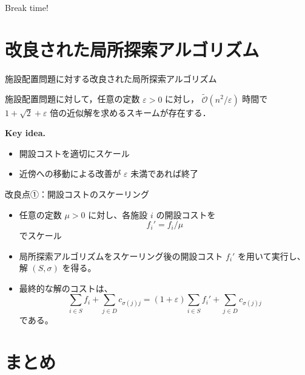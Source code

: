 \documentclass[aspectratio=169]{beamer}
\begin{document}
\begin{frame}[standout]
  Break time!
\end{frame}

\section{改良された局所探索アルゴリズム}

\begin{frame}{施設配置問題に対する改良された局所探索アルゴリズム}
  \begin{theorem}
    施設配置問題に対して，任意の定数 \(\varepsilon > 0\) に対し，
    \alert{\(\tilde{\mathcal{O}}(n^2/\varepsilon)\)} 時間で \alert{\(1 + \sqrt{2} + \varepsilon\)} 倍の近似解を求めるスキームが存在する．
  \end{theorem}

  \textbf{Key idea. }
  \begin{itemize}
    \item 開設コストを適切にスケール
    \item 近傍への移動による改善が \(\varepsilon\) 未満であれば終了
  \end{itemize}
\end{frame}

\begin{frame}{改良点①：開設コストのスケーリング}
  \begin{itemize}
    \item 任意の定数 \(\mu > 0\) に対し、各施設 \(i\) の開設コストを
          \[
            f_i' = f_i / \mu
          \]
          でスケール
    \item 局所探索アルゴリズムをスケーリング後の開設コスト \(f_i'\) を用いて実行し、解 \((S, \sigma)\) を得る。
    \item 最終的な解のコストは、
          \[
            \sum_{i \in S} f_i + \sum_{j \in D} c_{\sigma(j)j} = (1 + \varepsilon) \sum_{i \in S} f_i' + \sum_{j \in D} c_{\sigma(j)j}
          \]
          である。
  \end{itemize}

\end{frame}

\section{まとめ}
\end{document}
